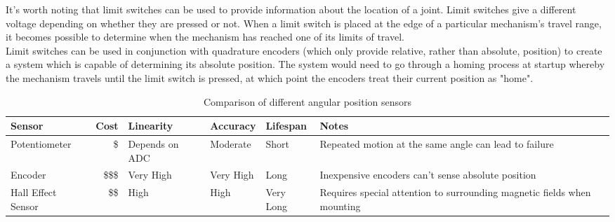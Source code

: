 \newline
It's worth noting that limit switches can be used to provide information about the location of a joint. Limit switches give a different voltage depending on whether they are pressed or not. When a limit switch is placed at the edge of a particular mechanism's travel range, it becomes possible to determine when the mechanism has reached one of its limits of travel. \\
\newline
Limit switches can be used in conjunction with quadrature encoders (which only provide relative, rather than absolute, position) to create a system which is capable of determining its absolute position. The system would need to go through a homing process at startup whereby the mechanism travels until the limit switch is pressed, at which point the encoders treat their current position as "home".

\begin{table}[H]
	\begin{center}
		\caption{Comparison of different angular position sensors}
		\label{tbl:Angular_pos_sensors}
		\begin{tabular}{ | p{2.4cm} | r | p{1.6cm} | l | l | p{2.5cm} |}
			\hline
			Sensor & Cost & Linearity & Accuracy & Lifespan & Notes
			\\ \hline
			Potentiometer & \$ & Depends on ADC & Moderate & Short & Repeated motion at the same angle can lead to failure
			\\ \hline
			Encoder & \$\$\$ & Very High & Very High & Long & Inexpensive encoders can't sense absolute position
			\\ \hline
			Hall Effect Sensor & \$\$ & High & High & Very Long & Requires special attention to surrounding magnetic fields when mounting
			\\ \hline
		\end{tabular}
	\end{center}
\end{table}

